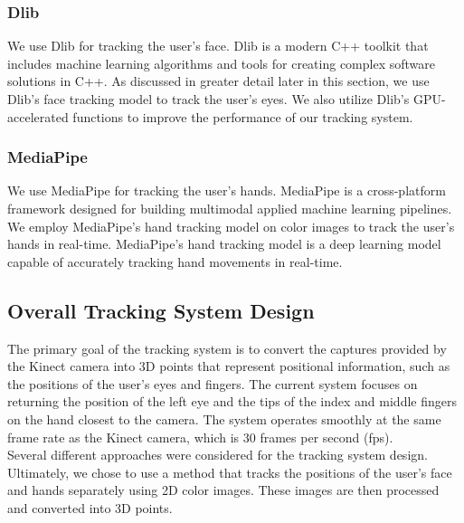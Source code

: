 \subsubsection{Dlib}

We use Dlib \cite{dlib09} for tracking the user's face. Dlib is a modern C++ toolkit that includes machine learning algorithms and tools for creating complex software solutions in C++. As discussed in greater detail later in this section, we use Dlib's face tracking model to track the user's eyes. We also utilize Dlib's GPU-accelerated functions to improve the performance of our tracking system.

\subsubsection{MediaPipe}

We use MediaPipe \cite{lugaresi2019mediapipe} for tracking the user's hands. MediaPipe is a cross-platform framework designed for building multimodal applied machine learning pipelines. We employ MediaPipe's hand tracking model on color images to track the user's hands in real-time. MediaPipe's hand tracking model is a deep learning model capable of accurately tracking hand movements in real-time.



\subsection{Overall Tracking System Design}

The primary goal of the tracking system is to convert the captures provided by the Kinect camera into 3D points that represent positional information, such as the positions of the user's eyes and fingers. The current system focuses on returning the position of the left eye and the tips of the index and middle fingers on the hand closest to the camera. The system operates smoothly at the same frame rate as the Kinect camera, which is 30 frames per second (fps). \\

Several different approaches were considered for the tracking system design. Ultimately, we chose to use a method that tracks the positions of the user's face and hands separately using 2D color images. These images are then processed and converted into 3D points. \\

